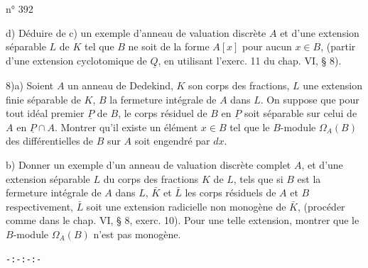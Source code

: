 \hfill n° 392

d) Déduire de c) un exemple d'anneau de valuation discrète $A$ et d'une extension séparable $L$ de $K$ tel que $B$ ne soit de la forme $A[x]$ pour aucun $x\in B$, (partir d'une extension cyclotomique de $\underline{Q}$, en utilisant l'exerc. 11 du chap. VI, § 8).

8)\qquad a) Soient $A$ un anneau de Dedekind, $K$ son corps des fractions, $L$ une extension finie séparable de $K$, $B$ la fermeture intégrale de $A$ dans $L$. On suppose que pour tout idéal premier $\underline{P}$ de $B$, le corps résiduel de $B$ en $\underline{P}$ soit séparable sur celui de $A$ en $\underline{P}\cap A$. Montrer qu'il existe un élément $x\in B$ tel que le $B$-module $\Omega_A(B)$ des différentielles de $B$ sur $A$ soit engendré par $dx$.

b) Donner un exemple d'un anneau de valuation discrète complet $A$, et d'une extension séparable $L$ du corps des fractions $K$ de $L$, tels que si $B$ est la fermeture intégrale de $A$ dans $L$, $\bar K$ et $\bar L$ les corps résiduels de $A$ et $B$ respectivement, $\bar L$ soit une extension radicielle non monogène de $\bar K$, (procéder comme dans le chap. VI, § 8, exerc. 10). Pour une telle extension, montrer que le $B$-module $\Omega_A(B)$ n'est pas monogène.

\begin{center}\texttt{-:-:-:-}\end{center}
